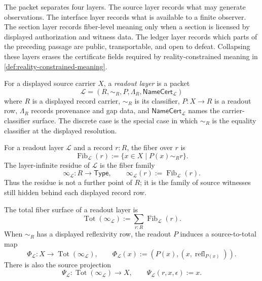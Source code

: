 \begin{principle}
\label{prin:interface-constraint-section-layer-discipline}
The packet separates four layers. The source layer records what may
generate observations. The interface layer records what is available to
a finite observer. The section layer records fiber-level meaning only
when a section is licensed by displayed authorization and witness data.
The ledger layer records which parts of the preceding passage are public,
transportable, and open to defeat. Collapsing these layers erases the
certificate fields required by reality-constrained meaning in
\autoref{def:reality-constrained-meaning}.
\end{principle}

\begin{definition}
\label{def:interface-readout-layer}
For a displayed source carrier $X$, a \emph{readout layer} is a packet
$$
\mathcal L=(R,\sim_R,P,\Lambda_R,\mathsf{NameCert}_{\mathcal L})
$$
where $R$ is a displayed record carrier, $\sim_R$ is its classifier,
$P:X\to R$ is a readout row, $\Lambda_R$ records provenance and gap
data, and $\mathsf{NameCert}_{\mathcal L}$ names the carrier-classifier
surface. The discrete case is the special case in which $\sim_R$ is the
equality classifier at the displayed resolution.
\end{definition}

\begin{definition}
\label{def:interface-layer-fiber-family}
For a readout layer $\mathcal L$ and a record $r:R$, the fiber over $r$
is
$$
\operatorname{Fib}_{\mathcal L}(r)
:=
\{x\in X\mid P(x)\sim_R r\}.
$$
The layer-infinite residue of $\mathcal L$ is the fiber family
$$
\infty_{\mathcal L}:R\to\mathsf{Type},
\qquad
\infty_{\mathcal L}(r):=\operatorname{Fib}_{\mathcal L}(r).
$$
Thus the residue is not a further point of $R$; it is the family of
source witnesses still hidden behind each displayed record row.
\end{definition}

\begin{definition}
\label{def:interface-total-fiber-surface}
The total fiber surface of a readout layer is
$$
\operatorname{Tot}(\infty_{\mathcal L})
:=
\sum_{r:R}\operatorname{Fib}_{\mathcal L}(r).
$$
When $\sim_R$ has a displayed reflexivity row, the readout $P$ induces
a source-to-total map
$$
\Phi_{\mathcal L}:X\to\operatorname{Tot}(\infty_{\mathcal L}),
\qquad
\Phi_{\mathcal L}(x):=(P(x),(x,\operatorname{refl}_{P(x)})).
$$
There is also the source projection
$$
\Psi_{\mathcal L}:\operatorname{Tot}(\infty_{\mathcal L})\to X,
\qquad
\Psi_{\mathcal L}(r,x,\epsilon):=x.
$$
\end{definition}

